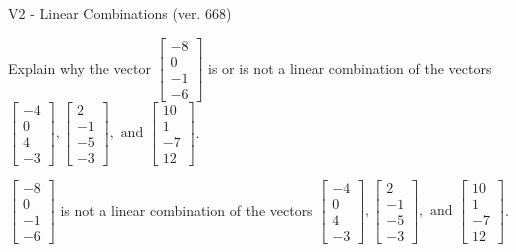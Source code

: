 \begin{exercise}
  \begin{exerciseTitle}V2 - Linear Combinations (ver. 668)\end{exerciseTitle}
  \begin{exerciseStatement}
    Explain why the vector \(\left[\begin{array}{c}
-8 \\
0 \\
-1 \\
-6
\end{array}\right]\)  is or is not a linear 
	combination of the vectors \(\left[\begin{array}{c}
-4 \\
0 \\
4 \\
-3
\end{array}\right] , \left[\begin{array}{c}
2 \\
-1 \\
-5 \\
-3
\end{array}\right] , \text{ and } \left[\begin{array}{c}
10 \\
1 \\
-7 \\
12
\end{array}\right]\).
	


  \end{exerciseStatement}
  \begin{exerciseAnswer}
   \(\left[\begin{array}{c}
-8 \\
0 \\
-1 \\
-6
\end{array}\right]\) 
  	 is not  
	a linear combination of the vectors \(\left[\begin{array}{c}
-4 \\
0 \\
4 \\
-3
\end{array}\right] , \left[\begin{array}{c}
2 \\
-1 \\
-5 \\
-3
\end{array}\right] , \text{ and } \left[\begin{array}{c}
10 \\
1 \\
-7 \\
12
\end{array}\right]\).

	
  


  \end{exerciseAnswer}
\end{exercise}